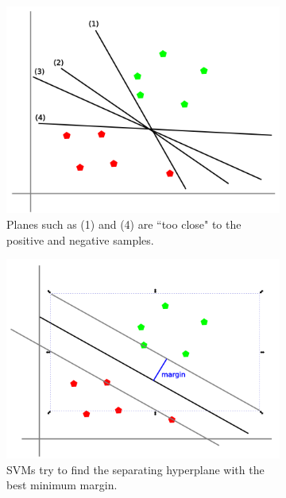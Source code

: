 \documentclass{article}
\theoremstyle{definition}
\theoremstyle{remark}
\theoremstyle{definition}
\begin{document}
\begin{figure}[hbt!] 
    \centering 
    \begin{subfigure}[b]{0.45\textwidth} 
        \centering 
        \includegraphics[width=\textwidth]{svm_intro.png} 
        \caption{Planes such as (1) and (4) are ``too close" to the positive and negative samples. } 
        \label{fig:svm_intro}
    \end{subfigure}
    \hfill
    \begin{subfigure}[b]{0.45\textwidth} 
        \centering 
        \includegraphics[width=\textwidth]{svm_intro_2.png}  
        \caption{SVMs try to find the separating hyperplane with the best minimum margin.} 
        \label{fig:svm_intro2}
    \end{subfigure} 

    \caption{} 
    \label{} 
\end{figure}
\end{document}
